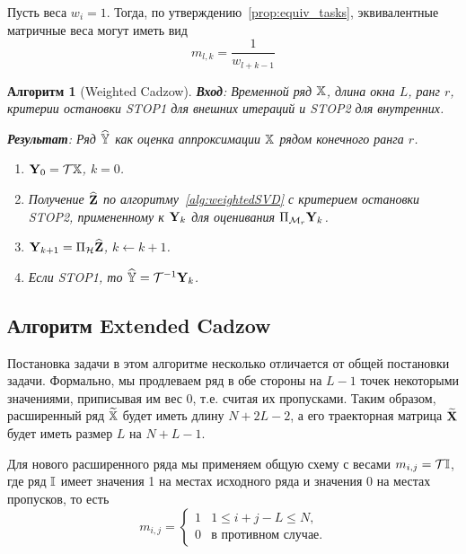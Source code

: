 \documentclass[12pt,a4paper,fleqn,leqno]{article}
\newtheorem{algorithm}{Алгоритм}%
\begin{document}
Пусть веса $w_{i}=1$. Тогда, по утверждению~\ref{prop:equiv_tasks}, эквивалентные матричные веса могут иметь вид
\begin{equation}
\label{Mw}
   m_{l, k} = \frac{1}{w_{l + k - 1}}
\end{equation}

\begin{algorithm}[Weighted Cadzow]
\textbf{Вход}: Временной ряд $\mathbb{X}$, длина окна $L$, ранг $r$,
критерии остановки STOP1 для внешних итераций и STOP2 для внутренних.

\textbf{Результат}:
Ряд $\widehat{\mathbb{Y}}$ как оценка аппроксимации $\mathbb{X}$ рядом конечного ранга $r$.

\begin{enumerate}
\item
$\mathbf{Y}_0 = \mathcal{T} \mathbb{X}$, $k=0$.
\item
Получение $\widehat{\mathbf{Z}}$ по алгоритму~\ref{alg:weightedSVD} с критерием остановки STOP2, примененному к $\mathbf{Y}_k$ для оценивания $\Pi_{\mathcal{M}_r} \mathbf{Y}_{k}$.
\item
$\mathbf{Y}_{k+1} = \Pi_{\mathcal{H}}  \widehat{\mathbf{Z}}$, $k\leftarrow k+1$.
\item
Если STOP1, то $\widehat{\mathbb{Y}} = \mathcal{T}^{-1} \mathbf{Y}_k$.
\end{enumerate}
\end{algorithm}

\subsection{Алгоритм Extended Cadzow}

Постановка задачи в этом алгоритме несколько отличается от общей постановки задачи.
Формально, мы продлеваем ряд в обе стороны на $L-1$ точек некоторыми значениями, приписывая им вес 0, т.е.
считая их пропусками. Таким образом, расширенный ряд $\widetilde{\mathbb{X}}$ будет иметь длину $N+2L-2$, а его траекторная матрица
$\widetilde{\mathbf{X}}$ будет иметь размер $L$ на $N+L-1$.

Для нового расширенного ряда мы применяем общую схему с весами $m_{i,j}=\mathcal{T} \mathbb{I}$, где ряд $\mathbb{I}$ имеет
значения 1 на местах исходного ряда и значения 0 на местах пропусков, то есть
\begin{equation*}
m_{i,j} = \begin{cases}
1 & 1 \le i+j-L \le N, \\
0 & \text{в противном случае.}
\end{cases}
\end{equation*}
\end{document}
